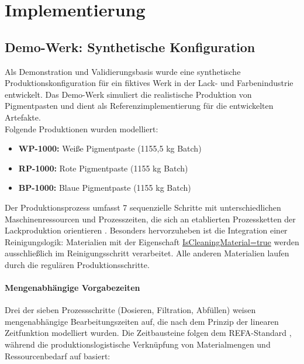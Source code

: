 \section{Implementierung}
\label{sec:Implementation}


\subsection{Demo-Werk: Synthetische Konfiguration}
\label{sec:DemoWerk}

Als Demonstration und Validierungsbasis wurde eine synthetische Produktionskonfiguration für ein fiktives Werk in der Lack- und Farbenindustrie entwickelt. Das Demo-Werk simuliert die realistische Produktion von Pigmentpasten und dient als Referenzimplementierung für die entwickelten Artefakte.\\

\noindent Folgende Produktionen wurden modelliert:

\begin{itemize}
    \item \textbf{WP-1000:} Weiße Pigmentpaste (1155,5 kg Batch)
    \item \textbf{RP-1000:} Rote Pigmentpaste (1155 kg Batch)
    \item \textbf{BP-1000:} Blaue Pigmentpaste (1155 kg Batch)
\end{itemize}

\noindent Der Produktionsprozess umfasst 7 sequenzielle Schritte mit unterschiedlichen Maschinenressourcen und Prozesszeiten, die sich an etablierten Prozessketten der Lackproduktion orientieren \citep{goldschmidt:lackproduktion2019}. Besonders hervorzuheben ist die Integration einer Reinigungslogik: Materialien mit der Eigenschaft \url{IsCleaningMaterial=true} werden ausschließlich im Reinigungsschritt verarbeitet. Alle anderen Materialien laufen durch die regulären Produktionsschritte.

\paragraph{Mengenabhängige Vorgabezeiten}

Drei der sieben Prozessschritte (Dosieren, Filtration, Abfüllen) weisen mengenabhängige Bearbeitungszeiten auf, die nach dem Prinzip der linearen Zeitfunktion modelliert wurden. Die Zeitbausteine folgen dem REFA-Standard \cite{REFA2012}, während die produktionslogistische Verknüpfung von Materialmengen und Ressourcenbedarf auf \cite{guenther:produktion2020} basiert:

